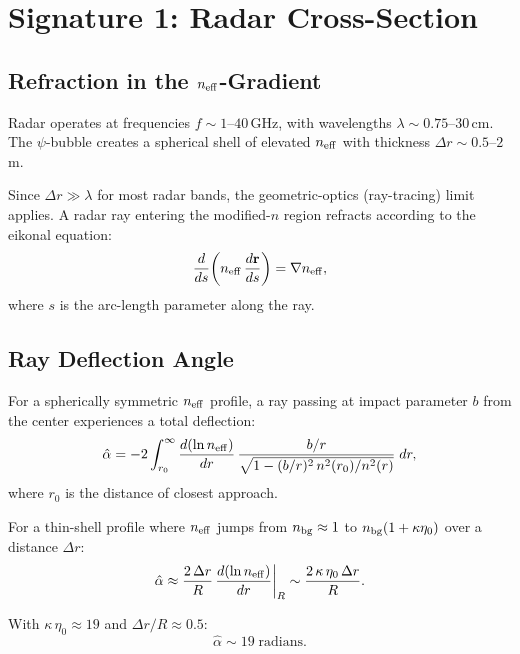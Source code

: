 \documentclass[11pt]{article}
\newcommand{\neff}{n_{\rm eff}}
\begin{document}
\section{Signature 1: Radar Cross-Section}\label{sec:radar}

\subsection{Refraction in the $\neff$-Gradient}

Radar operates at frequencies $f \sim 1$--$40$\,GHz, with wavelengths
$\lambda \sim 0.75$--$30$\,cm. The $\psi$-bubble creates a spherical shell
of elevated $\neff$ with thickness $\Delta r \sim 0.5$--$2$\,m.

Since $\Delta r \gg \lambda$ for most radar bands, the geometric-optics
(ray-tracing) limit applies. A radar ray entering the modified-$n$ region
refracts according to the eikonal equation:
\begin{equation}\label{eq:eikonal}
\frac{d}{ds}\!\left(\neff\,\frac{d\mathbf{r}}{ds}\right) = \nabla \neff,
\end{equation}
where $s$ is the arc-length parameter along the ray.

\subsection{Ray Deflection Angle}

For a spherically symmetric $\neff$ profile, a ray passing at impact
parameter $b$ from the center experiences a total deflection:
\begin{equation}\label{eq:deflection}
\hat{\alpha} = -2\int_{r_0}^{\infty}
  \frac{d(\ln\neff)}{dr}\,\frac{b/r}{\sqrt{1 - (b/r)^2\,n^2(r_0)/n^2(r)}}
  \;dr,
\end{equation}
where $r_0$ is the distance of closest approach.

For a thin-shell profile where $\neff$ jumps from $n_{\rm bg} \approx 1$
to $n_{\rm bg}(1 + \kappa\eta_0)$ over a distance $\Delta r$:
\begin{equation}\label{eq:alpha-approx}
\hat{\alpha} \approx \frac{2\,\Delta r}{R}\,\frac{d(\ln\neff)}{dr}\bigg|_R
  \sim \frac{2\,\kappa\,\eta_0\,\Delta r}{R}.
\end{equation}

With $\kappa\,\eta_0 \approx 19$ and $\Delta r/R \approx 0.5$:
\begin{equation}
\hat{\alpha} \sim 19\;\text{radians}.
\end{equation}
\end{document}
